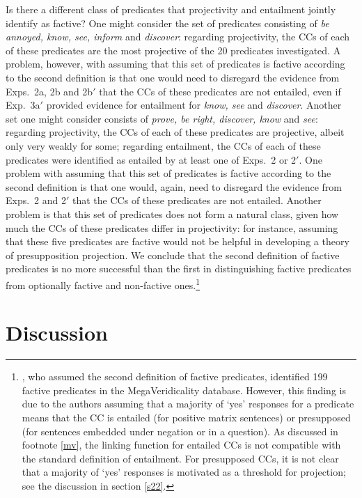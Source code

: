 \documentclass[11pt,fleqn]{article}
\newcommand{\6}{\mbox{$[\hspace*{-.6mm}[$}}
\newcommand{\9}{\mbox{$]\hspace*{-.6mm}]$}}
\begin{document}
{Is there a different class of predicates that projectivity and entailment jointly identify as factive? One might consider the set of predicates consisting of {\em be annoyed, know, see, inform} and {\em discover}: regarding projectivity,  the CCs of each of these predicates are the most projective of the 20 predicates investigated. A problem, however, with assuming that this set of predicates is factive according to the second definition is that one would need to disregard the evidence from Exps.~2a, 2b and 2b$'$ that the CCs of these predicates are not entailed, even if Exp.~3a$'$ provided evidence for entailment for {\em know, see} and {\em discover}. Another set one might consider consists of {\em  prove, be right, discover, know} and {\em see}: regarding projectivity, the CCs of each of these predicates are projective, albeit only very weakly for some; regarding entailment, the CCs of each of these predicates were identified as entailed by at least one of Exps.~2 or 2$'$. One problem with assuming that this set of predicates is factive according to the second definition is that one would, again, need to disregard the evidence from Exps.~2 and 2$'$ that the CCs of these predicates are not entailed. Another problem is that this set of predicates does not form a natural class, given how much the CCs of these predicates differ in projectivity: for instance, assuming that these five predicates are factive would not be helpful in developing a theory of presupposition projection. We conclude that the second definition of factive predicates is no more successful than the first in distinguishing factive predicates from optionally factive and non-factive ones.\footnote{\citet{white-rawlins-nels2018}, who assumed the second definition of factive predicates, identified 199 factive predicates in the MegaVeridicality database. However,  this finding is due to the authors assuming that a majority of `yes' responses for a predicate means that the CC is entailed (for positive matrix sentences) or presupposed (for sentences embedded under negation or in a question). As discussed in footnote \ref{mv}, the linking function for entailed CCs is not compatible with the standard definition of entailment. For presupposed CCs, it is not clear that a majority of `yes' responses is motivated as a threshold for projection; see the discussion in section \ref{s22}.} 

\section{Discussion}\label{s4}

}
\end{document}
